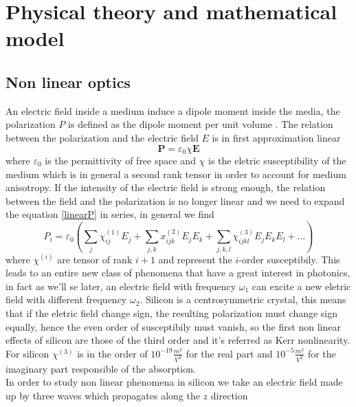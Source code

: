 \documentclass[12pt]{book}
\begin{document}

\tableofcontents




\chapter{Physical theory and mathematical model}
\section{Non linear optics}
An electric field inside a medium induce a dipole moment inside the media, the polarization $P$ is defined as the dipole moment per unit volume \cite{book:saleh}. The relation between the polarization and the electric field $E$ is in first approximation linear
\begin{equation}\label{linearP} \mathbf{P} = \varepsilon_0 \chi \mathbf{E}
\end{equation}
where $\varepsilon_0$ is the permittivity of free space and $\chi$ is the eletric susceptibility of the medium which is in general a second rank tensor in order to account for medium anisotropy. If the intensity of the electric field is strong enough, the relation between the field and the polarization is no longer linear and we need to expand the equation \eqref{linearP} in series, in general we find
\begin{equation}\label{nonlinearpolarization}P_i  = \varepsilon_0(\sum_j \chi_{ij}^{(1)} E_j + \sum_{j,k}x_{ijk}^{(2)}E_jE_k + \sum_{j,k,l}\chi_{ijkl}^{(3)}E_jE_kE_l + \dots )\end{equation}
where $\chi^{(i)}$ are tensor of rank $i+1$ and represent the $i$-order susceptibily. This leads to an entire new class of phenomena that have a great interest in photonics, in fact as we'll se later, an electric field with frequency $\omega_1$ can excite a new eletric field with different frequency $\omega_2$. Silicon is a centrosymmetric crystal, this means that if the eletric field change sign, the resulting polarization must change sign equally, hence the even order of susceptibily must vanish, so the first non linear effects of silicon are those of the third order and it's referred as Kerr nonlinearity. For silicon $\chi^{(3)}$ is in the order of $10^{-19} \frac{m^2}{V^2}$ for the real part and $10^{-5} \frac{m^2}{V^2}$ for the imaginary part responsible of the absorption. \\
In order to study non linear phenomena in silicon we take an electric field made up by three waves which propagates along the $z$ direction
\end{document}
